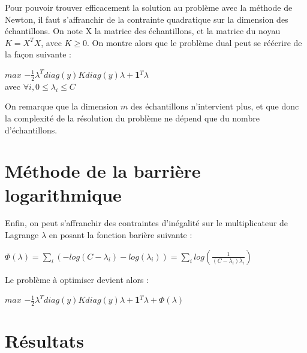\documentclass{article}
\begin{document}
Pour pouvoir trouver efficacement la solution au problème avec la méthode de Newton, il faut s'affranchir de la contrainte quadratique sur la dimension des échantillons. On note X la matrice des échantillons, et la matrice du noyau $K = X^TX$, avec $K \geq 0$. On montre alors que le problème dual peut se réécrire de la façon suivante :\\

                 \begin{center}
                 $max$ $-\frac{1}{2}\lambda^Tdiag(y)Kdiag(y)\lambda+$\textbf{1}$^T\lambda$\\
                 avec $\forall i, 0 \leq \lambda_i \leq C$ 
                 \end{center}

On remarque que la dimension $m$ des échantillons n'intervient plus, et que donc la complexité de la résolution du problème ne dépend que du nombre d'échantillons. 

\section{Méthode de la barrière logarithmique}

Enfin, on peut s'affranchir des contraintes d'inégalité sur le multiplicateur de Lagrange $\lambda$ en posant la fonction barière suivante :\\

          \begin{center}
          $\Phi(\lambda) = \sum_i (- log(C - \lambda_i) - log(\lambda_i)) = \sum_i log(\frac{1}{(C - \lambda_i)\lambda_i})$ 
          \end{center}

Le problème à optimiser devient alors :\\

          \begin{center}
          $max$ $-\frac{1}{2}\lambda^Tdiag(y)Kdiag(y)\lambda+$\textbf{1}$^T\lambda + \Phi(\lambda)$\\ 
          \end{center}

\section{Résultats}
\end{document}
